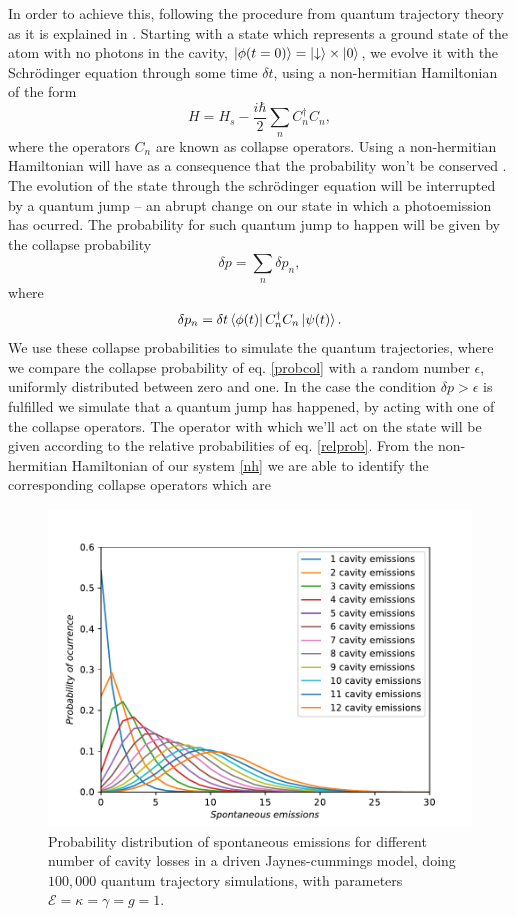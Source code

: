 \documentclass[conference]{IEEEtran}
\begin{document}
In order to achieve this, following the procedure from quantum trajectory theory as it is explained in \cite{bla}. Starting with a state which represents a ground state of the atom with no photons in the cavity, $\ket{\phi(t = 0)} = \ket{\downarrow} \times \ket{0}$, we evolve it with the Schrödinger equation through some time $\delta t$, using a non-hermitian Hamiltonian of the form
\begin{equation}
H = H_s - \frac{i\hbar}{2}\sum_n C^\dagger_n C_n,
\end{equation}
where the operators $C_n$ are known as collapse operators.
Using a non-hermitian Hamiltonian will have as a consequence that the probability won't be conserved \cite{Sakurai:1167961}. The evolution of the state through the schrödinger equation will be interrupted by a quantum jump – an abrupt change on our state in which a photoemission has ocurred. The probability for such quantum jump to happen will be given by the collapse probability
\begin{equation} \label{probcol}
\delta p = \sum_n \delta p_n,
\end{equation}
where 
\begin{equation} \label{relprob}
\delta p_n = \delta t \bra{\phi (t)} C^\dagger_n C_n \ket{\psi (t)}.
\end{equation}
We use these collapse probabilities to simulate the quantum trajectories, where we compare the collapse probability of eq. \eqref{probcol} with a random number $\epsilon$, uniformly distributed between zero and one. In the case the condition $\delta p > \epsilon$ is fulfilled we simulate that a quantum jump has happened, by acting with one of the collapse operators. The operator with which we'll act on the state will be given according to the relative probabilities of eq. \eqref{relprob}. From the non-hermitian Hamiltonian of our system \eqref{nh} we are able to identify the corresponding collapse operators which are
\begin{figure}[!t] 
\centering
\includegraphics[scale = 0.5]{distributioneng.pdf}
\caption{\small{Probability distribution of spontaneous emissions for different number of cavity losses in a driven Jaynes-cummings model, doing $100,000$ quantum trajectory simulations, with parameters $\mathcal{E}  = \kappa = \gamma = g = 1$.}} \label{probdiss}
\end{figure}
\end{document}
